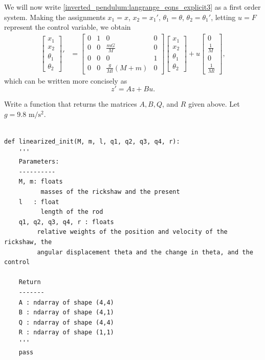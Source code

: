 We will now write \eqref{inverted_pendulum:langrange_eqns_explicit3} as a first order system. 
Making the assignments $x_1 = x$, $x_2 = x_1'$, $\theta_1 = \theta$, $\theta_2 = \theta_1'$, letting $u = F$ represent the control variable, we obtain 
\begin{align*}
\begin{bmatrix}
x_1\\
x_2 \\
\theta_1 \\
\theta_2
\end{bmatrix}' &= 
\begin{bmatrix}
0 & 1 & 0 & 0\\
0 & 0 & \frac{mG}{M} & 0 \\
0 & 0 & 0 & 1 \\
0 & 0 & \frac{g}{Ml}(M+m) & 0
\end{bmatrix}
\begin{bmatrix}
x_1\\
x_2 \\
\theta_1 \\
\theta_2
\end{bmatrix} + u
\begin{bmatrix}
0\\
\frac{1}{M} \\
0 \\
\frac{1}{Ml}
\end{bmatrix},
\end{align*}
which can be written more concisely as 
\[z' = Az + Bu.\]


\begin{problem}
Write a function that returns the matrices $A, B, Q$, and $R$ given above. Let $g = 9.8\text{ m}/\text{s}^2$.	
	
\begin{lstlisting}

def linearized_init(M, m, l, q1, q2, q3, q4, r): 
	'''
	Parameters:
	----------
	M, m: floats
          masses of the rickshaw and the present
	l 	: float
          length of the rod
	q1, q2, q3, q4, r : floats
         relative weights of the position and velocity of the rickshaw, the 
		 angular displacement theta and the change in theta, and the control
	
	Return
	-------
	A : ndarray of shape (4,4) 
	B : ndarray of shape (4,1) 
	Q : ndarray of shape (4,4) 
	R : ndarray of shape (1,1) 
	'''
	pass	
\end{lstlisting}
\end{problem}


